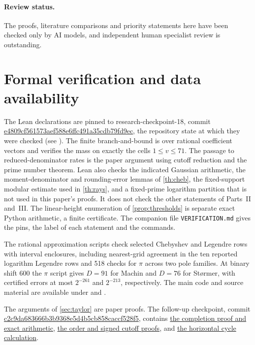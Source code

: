 \documentclass[11pt]{article}
\begin{document}
\paragraph{Review status.} The proofs, literature comparisons and priority statements here have been checked only by AI models, and independent human specialist review is outstanding.

\section{Formal verification and data availability}\label{sec:verification}

The Lean declarations are pinned to research-checkpoint-18, commit \url{e4809cf561573aef588e6ffc491a35cdb79fd9ec}, the repository state at which they were checked (see ). The finite branch-and-bound is over rational coefficient vectors and verifies the mass on exactly the cells $1\le v\le71$. The passage to reduced-denominator rates is the paper argument using cutoff reduction and the prime number theorem. Lean also checks the indicated Gaussian arithmetic, the moment-denominator and rounding-error lemmas of \cref{th:cheb}, the fixed-support modular estimate used in \cref{th:rays}, and a fixed-prime logarithm partition that is not used in this paper's proofs. It does not check the other statements of Parts~II and~III. The linear-height enumeration of \cref{prop:thresholds} is separate exact Python arithmetic, a finite certificate. The companion file \texttt{VERIFICATION.md} gives the pins, the label of each statement and the commands.

The rational approximation scripts check selected Chebyshev and Legendre rows with interval enclosures, including nearest-grid agreement in the ten reported logarithm Legendre rows and 518 checks for $\pi$ across two pole families. At binary shift 600 the $\pi$ script gives $D=91$ for Machin and $D=76$ for St{\o}rmer, with certified errors at most $2^{-261}$ and $2^{-213}$, respectively.  The main code and source material are available under  and .

The arguments of \cref{sec:taylor} are paper proofs. The follow-up checkpoint, commit \url{c2c9da683666b3b9368e5d4b5cb858caccf528f5}, contains
\href{https://github.com/eldernos/MathematicsResearch/blob/c2c9da683666b3b9368e5d4b5cb858caccf528f5/notes/phase19/classical.md}{the completion proof and exact arithmetic},
\href{https://github.com/eldernos/MathematicsResearch/blob/c2c9da683666b3b9368e5d4b5cb858caccf528f5/notes/phase19/taylor-periods.md}{the order and signed cutoff proofs}, and
\href{https://github.com/eldernos/MathematicsResearch/blob/c2c9da683666b3b9368e5d4b5cb858caccf528f5/notes/phase19/logarithm-rays.md}{the horizontal cycle calculation}.
\end{document}
